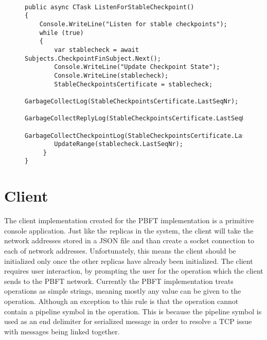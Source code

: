 \begin{figure}[H]
	\centering
	\begin{lstlisting}[label = code:ListenForCheckpoint, caption=Listener for valid checkpoint, captionpos = b, basicstyle=\scriptsize]

public async CTask ListenForStableCheckpoint()
{
    Console.WriteLine("Listen for stable checkpoints");
    while (true)
    {
    	var stablecheck = await Subjects.CheckpointFinSubject.Next();
        Console.WriteLine("Update Checkpoint State");
        Console.WriteLine(stablecheck);
        StableCheckpointsCertificate = stablecheck;
        GarbageCollectLog(StableCheckpointsCertificate.LastSeqNr);
        GarbageCollectReplyLog(StableCheckpointsCertificate.LastSeqNr);
        GarbageCollectCheckpointLog(StableCheckpointsCertificate.LastSeqNr);
        UpdateRange(stablecheck.LastSeqNr);
     }
}
    \end{lstlisting}
\end{figure}

\section{Client}
The client implementation created for the PBFT implementation is a primitive console application. Just like the replicas in the system, the client will take the network addresses stored in a JSON file and than create a socket connection to each of network addresses. Unfortunately, this means the client should be initialized only once the other replicas have already been initialized. The client requires user interaction, by prompting the user for the operation which the client sends to the PBFT network. Currently the PBFT implementation treats operations as simple strings, meaning mostly any value can be given to the operation. Although an exception to this rule is that the operation cannot contain a pipeline symbol in the operation. This is because the pipeline symbol is used as an end delimiter for serialized message in order to resolve a TCP issue with messages being linked together.

